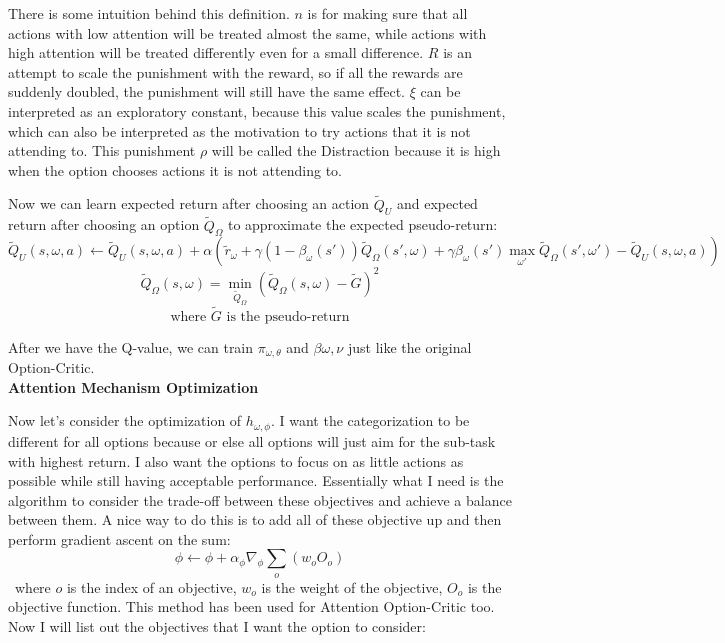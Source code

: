 \documentclass{article}
\begin{document}
	\quad There is some intuition behind this definition. $n$ is for making sure that all actions with low attention will be treated almost the same, while actions with high attention will be treated differently even for a small difference. $R$ is an attempt to scale the punishment with the reward, so if all the rewards are suddenly doubled, the punishment will still have the same effect. $\xi$ can be interpreted as an exploratory constant, because this value scales the punishment, which can also be interpreted as the motivation to try actions that it is not attending to. This punishment $
	\rho$ will be called the Distraction because it is high when the option chooses actions it is not attending to.
	
	\quad Now we can learn expected return after choosing an action $\widetilde{Q}_U$ and expected return after choosing an option $\widetilde{Q}_\Omega$ to approximate the expected pseudo-return:$$\widetilde{Q}_U(s,\omega,a) \leftarrow \widetilde{Q}_U(s,\omega,a) + \alpha(\widetilde{r}_\omega + \gamma(1-\beta_\omega(s'))\widetilde{Q}_\Omega(s',\omega)+\gamma \beta_\omega(s')\max_{\omega'} \widetilde{Q}_\Omega(s',\omega') - \widetilde{Q}_U(s,\omega,a))$$ $$\widetilde{Q}_\Omega(s,\omega)=\min_{\widetilde{Q}_\Omega} (\widetilde{Q}_\Omega(s,\omega)-\widetilde{G})^2$$ $$\textrm{where } \widetilde{G} \textrm{ is the pseudo-return}$$
	
	\quad After we have the Q-value, we can train $\pi_{\omega,\theta}$ and $\beta{\omega, \nu}$ just like the original Option-Critic.\vspace{0.2in}\\
	{\bfseries Attention Mechanism Optimization}\vspace{0.05in}
	
	\quad Now let's consider the optimization of $h_{\omega,\phi}$. I want the categorization to be different for all options because or else all options will just aim for the sub-task with highest return. I also want the options to focus on as little actions as possible while still having acceptable performance. Essentially what I need is the algorithm to consider the trade-off between these objectives and achieve a balance between them. A nice way to do this is to add all of these objective up and then perform gradient ascent on the sum: $$\phi \leftarrow \phi + \alpha_\phi \nabla_\phi \sum_{o} (w_o O_o)$$ \qquad \ where $o$ is the index of an objective, $w_o$ is the weight of the objective, $O_o$ is the objective function.
	\quad This method has been used for Attention Option-Critic too. Now I will list out the objectives that I want the option to consider: 
	
\end{document}
